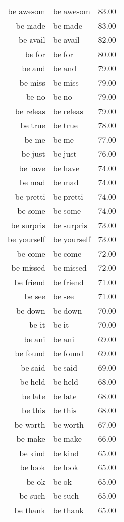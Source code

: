 \begin{table}[ht]
\begin{tabular}{rlr}
  be awesom & be awesom & 83.00 \\ 
  be made & be made & 83.00 \\ 
  be avail & be avail & 82.00 \\ 
  be for & be for & 80.00 \\ 
  be and & be and & 79.00 \\ 
  be miss & be miss & 79.00 \\ 
  be no & be no & 79.00 \\ 
  be releas & be releas & 79.00 \\ 
  be true & be true & 78.00 \\ 
  be me & be me & 77.00 \\ 
  be just & be just & 76.00 \\ 
  be have & be have & 74.00 \\ 
  be mad & be mad & 74.00 \\ 
  be pretti & be pretti & 74.00 \\ 
  be some & be some & 74.00 \\ 
  be surpris & be surpris & 73.00 \\ 
  be yourself & be yourself & 73.00 \\ 
  be come & be come & 72.00 \\ 
  be missed & be missed & 72.00 \\ 
  be friend & be friend & 71.00 \\ 
  be see & be see & 71.00 \\ 
  be down & be down & 70.00 \\ 
  be it & be it & 70.00 \\ 
  be ani & be ani & 69.00 \\ 
  be found & be found & 69.00 \\ 
  be said & be said & 69.00 \\ 
  be held & be held & 68.00 \\ 
  be late & be late & 68.00 \\ 
  be this & be this & 68.00 \\ 
  be worth & be worth & 67.00 \\ 
  be make & be make & 66.00 \\ 
  be kind & be kind & 65.00 \\ 
  be look & be look & 65.00 \\ 
  be ok & be ok & 65.00 \\ 
  be such & be such & 65.00 \\ 
  be thank & be thank & 65.00 \\ 

\end{tabular}
\end{table}
